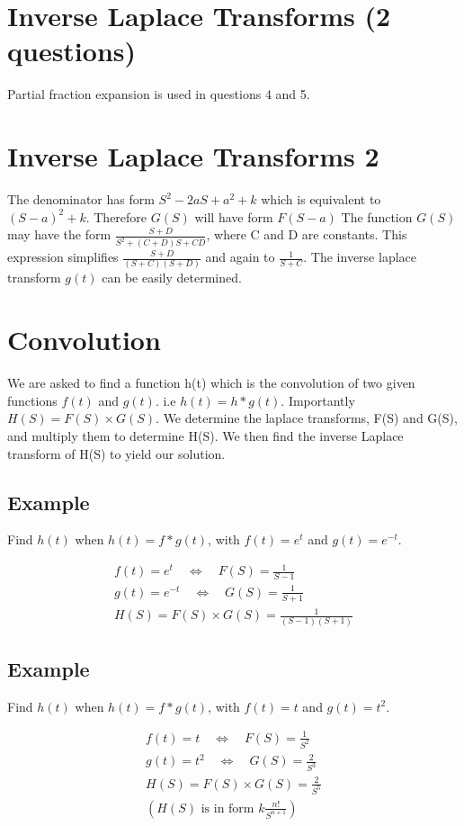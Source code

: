 \documentclass[12pt, a4paper]{article}
\begin{document}
\section{Inverse Laplace Transforms (2 questions) }
Partial fraction expansion is used in questions 4 and 5.
\section{Inverse Laplace Transforms 2}

The denominator has form $S^2 - 2aS + a^2 + k$ which is equivalent
to $(S-a)^2 + k$. Therefore $G(S)$ will have form $F(S-a)$
\newline
The function $G(S)$ may have the form $\frac{S+D}{S^2 +(C+D)S +
CD}$, where C and D are constants. This expression simplifies
$\frac{S+D}{(S+C)(S+D)}$ and again to $\frac{1}{S+C}$. The inverse
laplace transform $g(t)$ can be easily determined.
\section{Convolution}
We are asked to find a function h(t) which is the convolution of
two given functions $f(t)$ and $g(t)$. i.e $h(t)=h*g(t)$.\newline
Importantly $H(S) = F(S)\times G(S)$. We determine the laplace
transforms, F(S) and G(S), and multiply them to determine H(S). We
then find the inverse Laplace transform of H(S) to yield our
solution.
\subsection{Example}
Find $h(t)$ when $h(t) = f*g(t)$, with $f(t)= e^{t}$ and $g(t)=
e^{-t}$.\newline

\begin{eqnarray}
f(t) = e^{t} \quad \Leftrightarrow \quad F(S)= \frac{1}{S-1}
 \nonumber\\
g(t) = e^{-t} \quad \Leftrightarrow \quad G(S)= \frac{1}{S+1}
 \nonumber\\
H(S) = F(S)\times G(S) = \frac{1}{(S-1)(S+1)}
 \nonumber
\end{eqnarray}
\subsection{Example}
Find $h(t)$ when $h(t) = f*g(t)$, with $f(t)= t$ and $g(t)=
t^2$.\newline

\begin{eqnarray}
f(t) = t \quad \Leftrightarrow \quad F(S)= \frac{1}{S^2}
 \nonumber\\
g(t) = t^2 \quad \Leftrightarrow \quad G(S)= \frac{2}{S^3}
 \nonumber\\
H(S) = F(S)\times G(S) = \frac{2}{S^5}
 \nonumber\\
(H(S) \mbox{ is in form }  k\frac{n!}{S^{n+1}} )
 \nonumber
\end{eqnarray}
\end{document}
